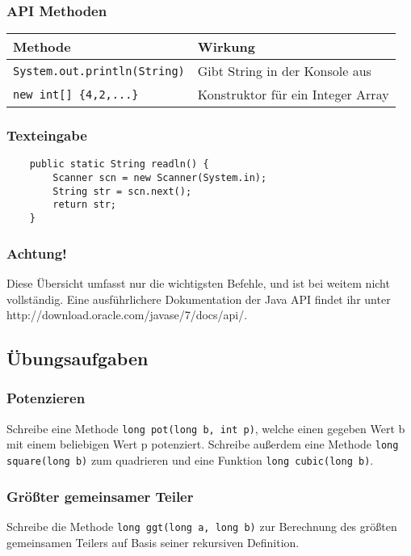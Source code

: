 		\subsubsection{API Methoden}
		\begin{tabular}{ll}
		\textbf{Methode} & \textbf{Wirkung}\\
		\hline
		\lstinline$System.out.println(String)$ & Gibt String in der Konsole aus\\
		\lstinline$new int[] {4,2,...}$ & Konstruktor für ein Integer Array\\		
		
		\end{tabular}

		\subsubsection{Texteingabe}
			\begin{lstlisting}
	public static String readln() {	
		Scanner scn = new Scanner(System.in);
		String str = scn.next();
		return str;
	}
			\end{lstlisting}

		\subsubsection{Achtung!}
			Diese Übersicht umfasst nur die wichtigsten Befehle, und ist bei weitem nicht vollständig. Eine ausführlichere Dokumentation der Java API findet ihr unter http://download.oracle.com/javase/7/docs/api/.

	\subsection{Übungsaufgaben}
		\subsubsection{Potenzieren}
			Schreibe eine Methode \lstinline$long pot(long b, int p)$, welche einen gegeben Wert b mit einem beliebigen Wert p potenziert. Schreibe außerdem eine Methode \lstinline$long square(long b)$ zum quadrieren und eine Funktion \lstinline$long cubic(long b)$.
		\subsubsection{Größter gemeinsamer Teiler}
			Schreibe die Methode \lstinline$long ggt(long a, long b)$ zur Berechnung des größten gemeinsamen Teilers auf Basis seiner rekursiven Definition.
